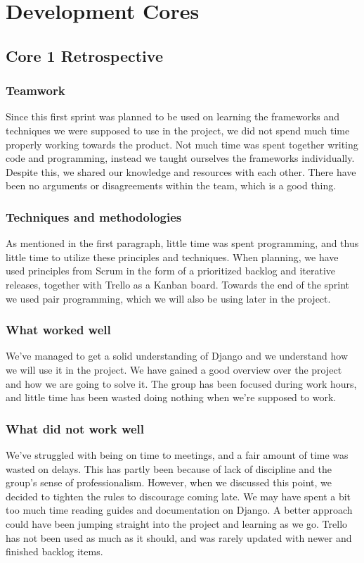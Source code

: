 \section {Development Cores}
\subsection{Core 1 Retrospective}
\subsubsection{Teamwork}
Since this first sprint was planned to be used on learning the frameworks
and techniques we were supposed to use in the project, we did not spend
much time properly working towards the product. Not much time was spent
together writing code and programming, instead we taught ourselves the
frameworks individually. Despite this, we shared our knowledge and resources
with each other. There have been no arguments or disagreements within the
team, which is a good thing.

\subsubsection{Techniques and methodologies}
As mentioned in the first paragraph, little time was spent programming, and
thus little time to utilize these principles and techniques. When planning,
we have used principles from Scrum in the form of a prioritized backlog and
iterative releases, together with Trello as a Kanban board. Towards the end
of the sprint we used pair programming, which we will also be using later in
the project.

\subsubsection{What worked well}
We’ve managed to get a solid understanding of Django and we understand
how we will use it in the project. We have gained a good overview over
the project and how we are going to solve it. The group has been focused
during work hours, and little time has been wasted doing nothing when we’re
supposed to work.

\subsubsection{What did not work well}
We’ve struggled with being on time to meetings, and a fair amount of time
was wasted on delays. This has partly been because of lack of discipline and
the group’s sense of professionalism. However, when we discussed this point,
we decided to tighten the rules to discourage coming late. We may have spent
a bit too much time reading guides and documentation on Django. A better
approach could have been jumping straight into the project and learning as
we go. Trello has not been used as much as it should, and was rarely updated
with newer and finished backlog items.

